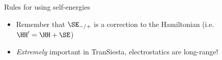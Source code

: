\begin{frame}
\begin{block}{Rules for using self-energies}
\begin{center}
    \end{center}

    \vspace{-12pt}

    \begin{itemize}
      \item<+-> Remember that $\SE_{-/+}$ is a correction to the Hamiltonian (i.e.
      $\HH' = \HH + \SE$)

      \item \emph{Extremely} important in TranSiesta, electrostatics are long-range!
    \end{itemize}
  \end{block}




\end{frame}


